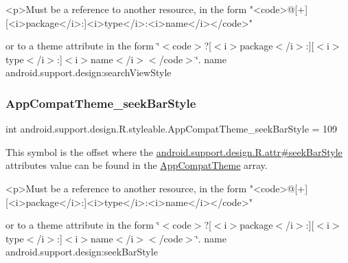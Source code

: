 \begin{DoxyVerb}      <p>Must be a reference to another resource, in the form "<code>@[+][<i>package</i>:]<i>type</i>:<i>name</i></code>"
\end{DoxyVerb}
 or to a theme attribute in the form \char`\"{}$<$code$>$?\mbox{[}$<$i$>$package$<$/i$>$\+:\mbox{]}\mbox{[}$<$i$>$type$<$/i$>$\+:\mbox{]}$<$i$>$name$<$/i$>$$<$/code$>$\char`\"{}.  name android.\+support.\+design\+:search\+View\+Style \mbox{\label{classandroid_1_1support_1_1design_1_1R_1_1styleable_a3a0b8e9f055894c1859484655adc6db6}} 
\subsubsection{\texorpdfstring{App\+Compat\+Theme\+\_\+seek\+Bar\+Style}{AppCompatTheme\_seekBarStyle}}
{\footnotesize\ttfamily int android.\+support.\+design.\+R.\+styleable.\+App\+Compat\+Theme\+\_\+seek\+Bar\+Style = 109\hspace{0.3cm}{\ttfamily [static]}}

This symbol is the offset where the \hyperlink{classandroid_1_1support_1_1design_1_1R_1_1attr_a1111429614a393a0cb64b39d2410a472}{android.\+support.\+design.\+R.\+attr\#seek\+Bar\+Style} attribute\textquotesingle{}s value can be found in the \hyperlink{classandroid_1_1support_1_1design_1_1R_1_1styleable_afb351dc8de20cbd4c89abe360373010c}{App\+Compat\+Theme} array.

\begin{DoxyVerb}      <p>Must be a reference to another resource, in the form "<code>@[+][<i>package</i>:]<i>type</i>:<i>name</i></code>"
\end{DoxyVerb}
 or to a theme attribute in the form \char`\"{}$<$code$>$?\mbox{[}$<$i$>$package$<$/i$>$\+:\mbox{]}\mbox{[}$<$i$>$type$<$/i$>$\+:\mbox{]}$<$i$>$name$<$/i$>$$<$/code$>$\char`\"{}.  name android.\+support.\+design\+:seek\+Bar\+Style \mbox{\label{classandroid_1_1support_1_1design_1_1R_1_1styleable_ad98a8eb57d72c1fb3c3e08668a810c3c}} 
